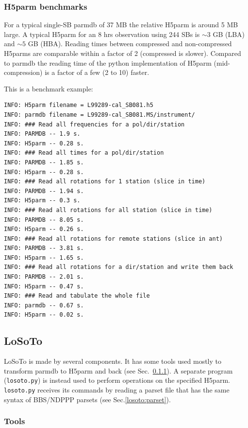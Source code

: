 \documentclass[]{article}
\def \losoto {LoSoTo}
\begin{document}
\subsubsection{H5parm benchmarks}

For a typical single-SB parmdb of 37 MB the relative H5parm is around 5 MB large. A typical H5parm for an 8 hrs observation using 244 SBs is $\sim 3$ GB (LBA) and $\sim 5$ GB (HBA). Reading times between compressed and non-compressed H5parms are comparable within a factor of 2 (compressed is slower). Compared to parmdb the reading time of the python implementation of H5parm (mid-compression) is a factor of a few (2 to 10) faster.

This is a benchmark example:

\begin{verbatim}
INFO: H5parm filename = L99289-cal_SB081.h5
INFO: parmdb filename = L99289-cal_SB081.MS/instrument/
INFO: ### Read all frequencies for a pol/dir/station
INFO: PARMDB -- 1.9 s.
INFO: H5parm -- 0.28 s.
INFO: ### Read all times for a pol/dir/station
INFO: PARMDB -- 1.85 s.
INFO: H5parm -- 0.28 s.
INFO: ### Read all rotations for 1 station (slice in time)
INFO: PARMDB -- 1.94 s.
INFO: H5parm -- 0.3 s.
INFO: ### Read all rotations for all station (slice in time)
INFO: PARMDB -- 8.05 s.
INFO: H5parm -- 0.26 s.
INFO: ### Read all rotations for remote stations (slice in ant)
INFO: PARMDB -- 3.81 s.
INFO: H5parm -- 1.65 s.
INFO: ### Read all rotations for a dir/station and write them back
INFO: PARMDB -- 2.01 s.
INFO: H5parm -- 0.47 s.
INFO: ### Read and tabulate the whole file
INFO: parmdb -- 0.67 s.
INFO: H5parm -- 0.02 s.
\end{verbatim}

\subsection{LoSoTo}
\label{losoto:overview}

\losoto{} is made by several components. It has some tools used mostly to transform parmdb to H5parm and back (see Sec.~\ref{losoto:tools}). A separate program (\texttt{losoto.py}) is instead used to perform operations on the specified H5parm. \texttt{losoto.py} receives its commands by reading a parset file that has the same syntax of BBS/NDPPP parsets (see Sec.\ref{losoto:parset}).

\subsubsection{Tools}
\label{losoto:tools}
\end{document}
